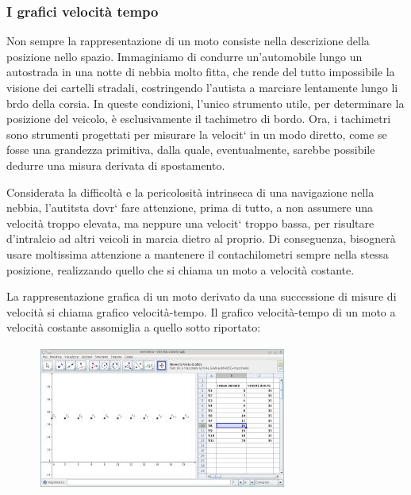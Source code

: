 \subsubsection*{I grafici velocità tempo}

Non sempre la rappresentazione di un moto consiste nella descrizione della posizione nello spazio.\newline
Immaginiamo di condurre un’automobile lungo un autostrada in una notte di
nebbia molto fitta, che rende del tutto impossibile la visione dei cartelli stradali,
costringendo l’autista a marciare lentamente lungo li brdo della corsia. In queste condizioni, l’unico strumento utile, per determinare la posizione del veicolo, è esclusivamente il tachimetro di bordo.\newline
Ora, i tachimetri sono strumenti progettati per misurare la velocit` in un modo diretto, come se fosse una grandezza primitiva, dalla quale, eventualmente,
sarebbe possibile dedurre una misura derivata di spostamento.
\newline

Considerata la difficoltà e la pericolosità intrinseca di una navigazione nella nebbia, l’autitsta dovr` fare attenzione, prima di tutto, a non assumere una velocità troppo elevata, ma neppure una velocit` troppo bassa, per risultare d’intralcio
ad altri veicoli in marcia dietro al proprio. Di conseguenza, bisognerà usare moltissima attenzione a mantenere il contachilometri sempre nella stessa posizione,
realizzando quello che si chiama un moto a velocità costante.\newline

La rappresentazione grafica di un moto derivato da una successione di misure
di velocità si chiama grafico velocità-tempo.\newline
Il grafico velocità-tempo di un moto a velocità costante assomiglia a quello sotto
riportato:
\begin{figure}[H]
 \centering
 \includegraphics[width=.7\textwidth]{../immagini/velocitaCostante.jpeg}
\end{figure}

